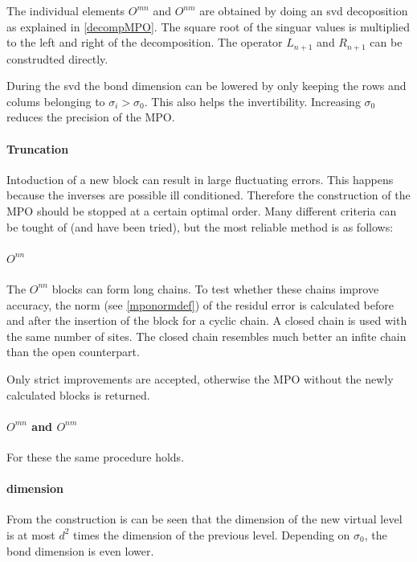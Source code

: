 The individual elements $O^{m n }$ and $O^{n m} $ are obtained by doing an svd decoposition as explained in \cref{decompMPO}. The square root of the singuar values is multiplied to the left and right of the decomposition. The operator $L_{n+1}$ and $R_{n+1}$ can be construdted directly. 

During the svd the bond dimension can be lowered by only keeping the rows and colums belonging to $\sigma_i > \sigma_0$. This also helps the invertibility. Increasing $\sigma_0$ reduces the precision of the MPO.

\paragraph{Truncation}

Intoduction of a new block can result in large fluctuating errors. This happens because the inverses are possible ill conditioned. Therefore the construction of the MPO should be stopped at a certain optimal order. Many different criteria can be tought of (and have been tried), but the most reliable method is as follows:

\paragraph{ \( O^{n n} \)}

The \( O^{n n} \) blocks can form long chains. To test whether these chains improve accuracy, the norm (see \cref{mponormdef}) of the residul error is calculated before and after the insertion of the block for a cyclic chain. A closed chain is used with the same number of sites. The closed chain resembles much better an infite chain than the open counterpart.

Only strict improvements are accepted, otherwise the MPO without the newly calculated blocks is returned.

\paragraph{$O^{m n}$ and $O^{n m}$ } For these the same procedure holds.

\paragraph{dimension}

From the construction is can be seen that  the dimension of the new virtual level is at most $d^2$ times the dimension of the previous level. Depending on $\sigma_0$, the bond dimension is even lower.

